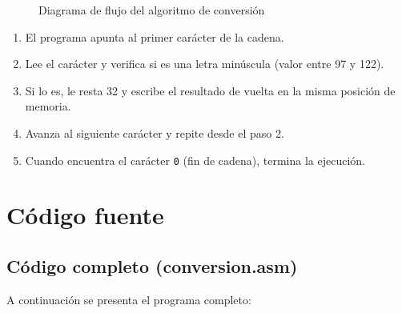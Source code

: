 \documentclass[12pt, letterpaper]{article}
\begin{document}
\begin{figure}[H]
{%
    }
    \caption{Diagrama de flujo del algoritmo de conversión}
\end{figure}

\begin{enumerate}
    \item El programa apunta al primer carácter de la cadena.
    \item Lee el carácter y verifica si es una letra minúscula (valor entre 97 y 122).
    \item Si lo es, le resta 32 y escribe el resultado de vuelta en la misma posición de memoria.
    \item Avanza al siguiente carácter y repite desde el paso 2.
    \item Cuando encuentra el carácter \texttt{0} (fin de cadena), termina la ejecución.
\end{enumerate}

\section{Código fuente}

\subsection{Código completo (conversion.asm)}

A continuación se presenta el programa completo:
\end{document}
